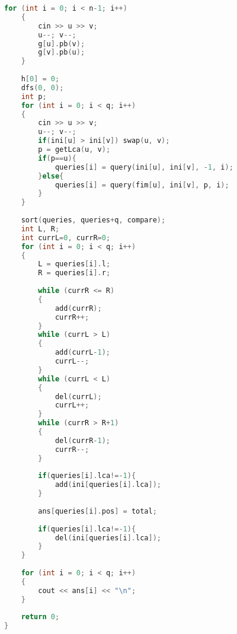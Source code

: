 \documentclass[12pt,a4paper,twoside]{report}
\begin{document}
\begin{lstlisting}[caption=MO em Árvore,language=C++]
    for (int i = 0; i < n-1; i++)
    {
        cin >> u >> v;
        u--; v--;
        g[u].pb(v);
        g[v].pb(u);
    }
     
    h[0] = 0;
    dfs(0, 0);
    int p;
    for (int i = 0; i < q; i++)
    {
        cin >> u >> v;
        u--; v--;
        if(ini[u] > ini[v]) swap(u, v);
        p = getLca(u, v);
        if(p==u){
            queries[i] = query(ini[u], ini[v], -1, i);
        }else{
            queries[i] = query(fim[u], ini[v], p, i);
        }
    }
     
    sort(queries, queries+q, compare);
    int L, R;
    int currL=0, currR=0;
    for (int i = 0; i < q; i++)
    {
        L = queries[i].l;
        R = queries[i].r;
         
        while (currR <= R)
        {
            add(currR);
            currR++;
        }
        while (currL > L)
        {
            add(currL-1);
            currL--;
        }
        while (currL < L)
        {
            del(currL);
            currL++;
        }
        while (currR > R+1)
        {
            del(currR-1);
            currR--;
        }
         
        if(queries[i].lca!=-1){
            add(ini[queries[i].lca]);
        }
         
        ans[queries[i].pos] = total;
         
        if(queries[i].lca!=-1){
            del(ini[queries[i].lca]);
        }
    }
     
    for (int i = 0; i < q; i++)
    {
        cout << ans[i] << "\n";
    }
     
    return 0;
}
\end{lstlisting}
\end{document}
